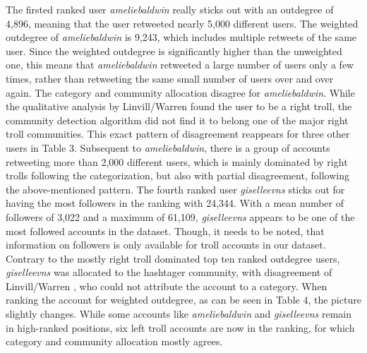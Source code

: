 \documentclass[12pt, titlepage=true, toc=bib]{scrartcl}
\begin{document}
The firsted ranked user \textit{ameliebaldwin} really sticks out with an outdegree of 4,896, meaning that the user retweeted nearly 5,000 different users. The weighted outdegree of \textit{ameliebaldwin} is 9,243, which includes multiple retweets of the same user. Since the weighted outdegree is significantly higher than the unweighted one, this means that \textit{ameliebaldwin} retweeted a large number of users only a few times, rather than retweeting the same small number of users over and over again. The category and community allocation disagree for \textit{ameliebaldwin}. While the qualitative analysis by Linvill/Warren \cite*{linvill_troll_2018} found the user to be a right troll, the community detection algorithm did not find it to belong one of the major right troll communities. This exact pattern of disagreement reappears for three other users in Table 3. Subsequent to \textit{ameliebaldwin}, there is a group of accounts retweeting more than 2,000 different users, which is mainly dominated by right trolls following the categorization, but also with partial disagreement, following the above-mentioned pattern. The fourth ranked user \textit{giselleevns} sticks out for having the most followers in the ranking with 24,344. With a mean number of followers of 3,022 and a maximum of 61,109, \textit{giselleevns} appears to be one of the most followed accounts in the dataset. Though, it needs to be noted, that information on followers is only available for troll accounts in our dataset. Contrary to the mostly right troll dominated top ten ranked outdegree users, \textit{giselleevns} was allocated to the hashtager community, with disagreement of Linvill/Warren \cite*{linvill_troll_2018}, who could not attribute the account to a category. When ranking the account for weighted outdegree, as can be seen in Table 4, the picture slightly changes. While some accounts like \textit{ameliebaldwin} and \textit{giselleevns} remain in high-ranked positions, six left troll accounts are now in the ranking, for which category and community allocation mostly agrees.
\end{document}
